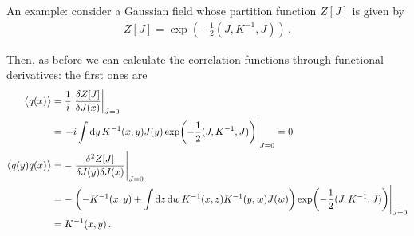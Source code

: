 \documentclass[main.tex]{subfiles}
\begin{document}

An example: consider a Gaussian field whose partition function \(Z[J]\) is given by 
%
\begin{align}
Z[J] = \exp( - \frac{1}{2} (J, K^{-1}, J))
\,.
\end{align}

Then, as before we can calculate the correlation functions through functional derivatives: the first ones are 
%
\begin{align}
\expval{q(x)} &= \frac{1}{i} \eval{\fdv{Z[J]}{J(x)}}_{J=0}  \\
&= \eval{-i \int \dd{y} K^{-1}(x, y) J(y) \exp(- \frac{1}{2} (J, K^{-1}, J))}_{J =0} =0\\
\expval{q(y)q(x)} &= -\eval{\frac{ \delta^2 Z[J]}{ \delta  J(y) \delta  J (x)}}_{J=0} \\
&= -\eval{\qty(-K^{-1}(x, y) + \int \dd{z} \dd{w} K^{-1} (x, z)K^{-1} (y, w) J(w))\exp(- \frac{1}{2} (J, K^{-1}, J))}_{J =0}  \\
&= K^{-1} (x, y)
\,.
\end{align}
\end{document}
